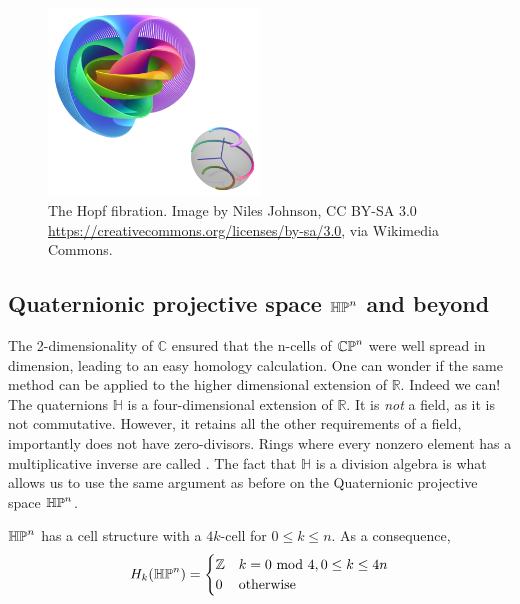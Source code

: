 \begin{figure}[h!]
    \centering
    \captionsetup{width=.7\linewidth}
    \includegraphics[width=0.5\textwidth]{hopf-fibration.png}
    \caption{The Hopf fibration. Image by Niles Johnson, CC BY-SA 3.0 \url{https://creativecommons.org/licenses/by-sa/3.0}, via Wikimedia Commons.}
    \label{hopf-fig}
\end{figure}
\subsection{Quaternionic projective space $\mathbb{HP}^{n}$ and beyond}
The 2-dimensionality of $\mathbb{C}$ ensured that the n-cells of $\mathbb{CP}^{n}$ were well spread in dimension, leading to an easy homology calculation. One can wonder if the same method can be applied to the higher dimensional extension of $\mathbb{R}$. Indeed we can! The quaternions $\mathbb{H}$ is a four-dimensional extension of $\mathbb{R}$. It is \textit{not} a field, as it is not commutative. However, it retains all the other requirements of a field, importantly does not have zero-divisors. Rings where every nonzero element has a multiplicative inverse are called . The fact that $\mathbb{H}$ is a division algebra is what allows us to use the same argument as before on the Quaternionic projective space $\mathbb{HP}^{n}$.

\begin{prop}
$\mathbb{HP}^{n}$ has a cell structure with a $4k$-cell for $0\leq k\leq n$. As a consequence, $$H_k(\mathbb{HP}^{n})=\begin{cases}\mathbb{Z} & k=0\text{ mod } 4 , 0\leq k\leq 4n \\ 0 & \text{otherwise}\end{cases}$$
\end{prop}

